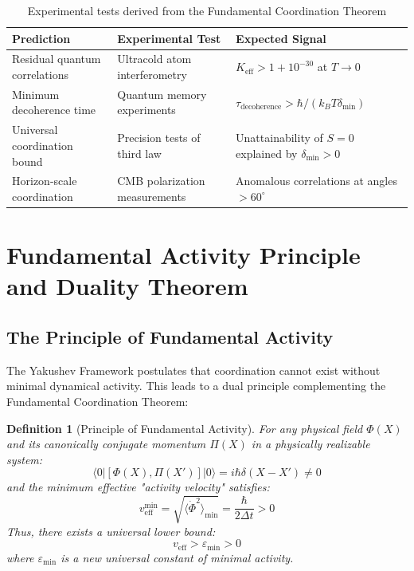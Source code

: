 \documentclass[11pt,a4paper]{article}
\newtheorem{definition}{Definition}
\begin{document}
\begin{table}[htbp]
	\centering
	\small
	\begin{tabular}{p{}p{}p{}}
		\toprule
		\textbf{Prediction} & \textbf{Experimental Test} & \textbf{Expected Signal} \\
		\midrule
		Residual quantum correlations & Ultracold atom interferometry & $K_{\mathrm{eff}} > 1 + 10^{-30}$ at $T \to 0$ \\
		Minimum decoherence time & Quantum memory experiments & $\tau_{\text{decoherence}} > \hbar/(k_B T \delta_{\min})$ \\
		Universal coordination bound & Precision tests of third law & Unattainability of $S=0$ explained by $\delta_{\min}>0$ \\
		Horizon-scale coordination & CMB polarization measurements & Anomalous correlations at angles $>60^\circ$ \\
		\bottomrule
	\end{tabular}
	\caption{Experimental tests derived from the Fundamental Coordination Theorem}
	\label{tab:theorem-predictions}
\end{table}


\section{Fundamental Activity Principle and Duality Theorem}
\label{sec:activity_principle}

\subsection{The Principle of Fundamental Activity}

The Yakushev Framework postulates that coordination cannot exist without minimal dynamical activity. This leads to a dual principle complementing the Fundamental Coordination Theorem:

\begin{definition}[Principle of Fundamental Activity]
	For any physical field $\Phi(X)$ and its canonically conjugate momentum $\Pi(X)$ in a physically realizable system:
	\[
	\langle 0 | [\Phi(X), \Pi(X')] | 0 \rangle = i\hbar\delta(X-X') \neq 0
	\]
	and the minimum effective "activity velocity" satisfies:
	\[
	v_{\mathrm{eff}}^{\min} = \sqrt{\langle \dot{\Phi}^2 \rangle_{\min}} = \frac{\hbar}{2\Delta t} > 0
	\]
	Thus, there exists a universal lower bound:
	\[
	\boxed{v_{\mathrm{eff}} > \varepsilon_{\min} > 0}
	\]
	where $\varepsilon_{\min}$ is a new universal constant of minimal activity.
\end{definition}
\end{document}
